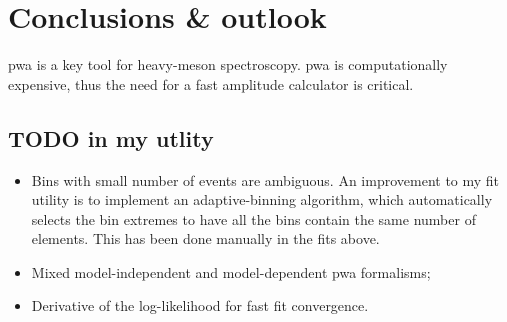 \chapter{Conclusions \& outlook}

    \ac{pwa} is a key tool for heavy-meson spectroscopy.
    \ac{pwa} is computationally expensive, thus the need for a fast amplitude calculator is critical.


    \section{TODO in my utlity}


    \begin{itemize}
        \item 
            Bins with small number of events are ambiguous. 
            An improvement to my fit utility is to implement an adaptive-binning algorithm, which automatically selects the bin extremes to have all the bins contain the same number of elements.
            This has been done manually in the fits above.

        \item Mixed model-independent and model-dependent \ac{pwa} formalisms;

        \item Derivative of the log-likelihood for fast fit convergence.
    \end{itemize}
